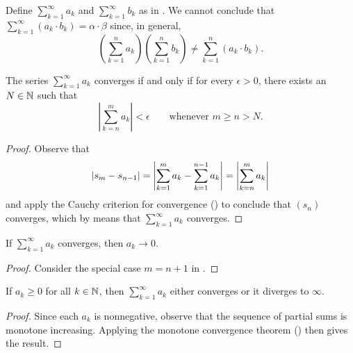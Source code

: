 \begin{remark}
  Define $\sum_{k = 1}^{\infty} a_k$ and $\sum_{k = 1}^{\infty} b_k$
  as in . We cannot conclude that $\sum_{k
  = 1}^{\infty} (a_k \cdot b_k) = \alpha \cdot \beta$ since, in general,
  \[ \left(\sum_{k = 1}^{n} a_k\right) \left(\sum_{k = 1}^{n}
  b_k\right) \neq \sum_{k = 1}^{n} (a_k \cdot b_k). \]
\end{remark}

\begin{theorem}
  The series $\sum_{k = 1}^{\infty} a_k$ converges if and only if for
  every $\epsilon > 0$, there exists an $N \in \mathbb N$ such that
  \[ \left|\sum_{k = n}^{m} a_k\right| < \epsilon \qquad
  \text{whenever $m \geq n > N$.}\]
\end{theorem}

\begin{proof}
  Observe that
  \[ | s_m - s_{n - 1} | = \left|\sum_{k = 1}^{m} a_k - \sum_{k =
  1}^{n - 1} a_k\right| = \left|\sum_{k = n}^{m} a_k\right| \]
  and apply the Cauchy criterion for convergence
  () to conclude that
  $(s_n)$ converges, which by 
  means that $\sum_{k = 1}^{\infty} a_k$ converges.
\end{proof}

\begin{theorem}
  If $\sum_{k = 1}^{\infty} a_k$ converges, then $a_k \to 0$.
\end{theorem}

\begin{proof}
  Consider the special case $m = n + 1$ in .
\end{proof}

\begin{lemma}
  If $a_k \geq 0$ for all $k \in \mathbb N$, then $\sum_{k = 1}^{\infty}
  a_k$ either converges or it diverges to $\infty$.
\end{lemma}

\begin{proof}
  Since each $a_k$ is nonnegative, observe that the sequence of
  partial sums is monotone increasing. Applying the monotone
  convergence theorem () then gives the result.
\end{proof}

